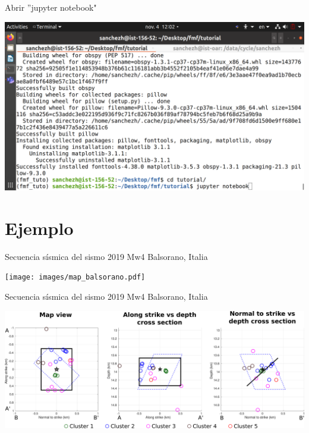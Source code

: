 \documentclass{beamer}
\begin{document}
\begin{frame}
 {Abrir ''jupyter notebook"}

 \centering
 \includegraphics[width=1\linewidth]{images/jupyter_notebook.png}
 
\end{frame}



\section{Ejemplo}

\begin{frame}
 {Secuencia s\'ismica del sismo 2019 Mw4 Balsorano, Italia}

 \begin{minipage}{1\linewidth}
  \centering \texttt{[image: images/map\_balsorano.pdf]}
 \end{minipage} 
 
\end{frame}


\begin{frame}
 {Secuencia s\'ismica del sismo 2019 Mw4 Balsorano, Italia}

 \begin{minipage}{1\linewidth}
  \centering \includegraphics[width=1\linewidth]{images/S6_templates_per_cluster_map.pdf}
 \end{minipage} 
 
\end{frame}
\end{document}
